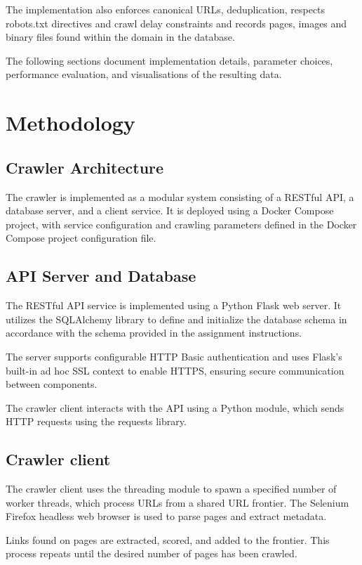 \documentclass[conference]{IEEEtran}
\begin{document}
The implementation also enforces canonical URLs, deduplication, respects robots.txt directives 
and crawl delay constraints and records pages, images and binary files found within the domain in 
the database.

The following sections document implementation details, parameter choices, performance evaluation, 
and visualisations of the resulting data.




\section{Methodology}


\subsection{Crawler Architecture}
The crawler is implemented as a modular system consisting of a RESTful API, a database server, and a client service. It is deployed using a Docker Compose project, with service configuration and crawling parameters defined in the Docker Compose project configuration file.

\subsection{API Server and Database}
The RESTful API service is implemented using a Python Flask\cite{flask} web server. It utilizes the SQLAlchemy\cite{sqlalchemy} library to define and initialize the database schema in accordance with the schema provided in the assignment instructions.

The server supports configurable HTTP Basic authentication and uses Flask’s built-in ad hoc SSL context to 
enable HTTPS, ensuring secure communication between components.

The crawler client interacts with the API using a Python module, which sends HTTP requests 
using the requests\cite{requests} library.

\subsection{Crawler client}
The crawler client uses the threading module to spawn a specified number of worker threads, 
which process URLs from a shared URL frontier. The Selenium \cite{selenium} Firefox headless web browser is used to parse pages and extract metadata.

Links found on pages are extracted, scored, and added to the frontier. This process repeats until the desired number of pages has been crawled. 
\end{document}
